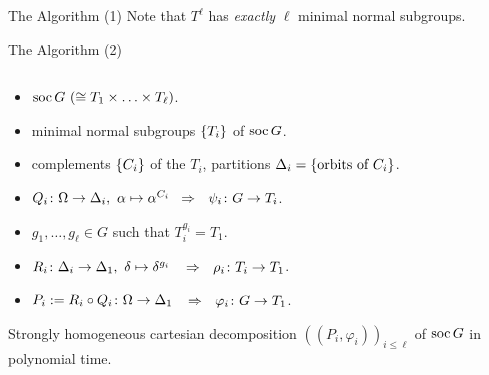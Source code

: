 \begin{frame}{The Algorithm (1)}
    \centering
    \large
    Note that $T ^ \ell$ has \emph{exactly} $\ell$ minimal normal subgroups.
\end{frame}

\begin{frame}{The Algorithm (2)}
    \begin{alg}
        $~$
        \\[-1em]
        \begin{itemize}
            \item
            $\operatorname{soc} G ~ (\cong T_1 \times \ldots \times T_\ell)$.
            \pause
            \item
            minimal normal subgroups $ \left\{  T_i  \right\} $ of $\operatorname{soc} G$.
            \pause
            \item
            complements $ \left\{  C_i  \right\} $ of the $T_i$,
            partitions $\Delta_i =  \left\{  \text{orbits of } C_i  \right\} $.
            \pause
            \item
            $Q_i \colon \Omega \rightarrow \Delta_i,
            ~ \alpha \mapsto \alpha ^ {C_i}$
            \pause
            $~\Rightarrow~~ \psi_i \colon G \rightarrow T_i$.
            \pause
            \item
            $g_1, \ldots, g_\ell \in G$ such that $T_i ^ {g_i} = T_1$.
            \pause
            \item
            $R_i \colon \Delta_i \rightarrow \Delta_1,
            ~ \delta \mapsto \delta ^ {g_i}$
            \pause
            $~~\Rightarrow~~ \rho_i \colon T_i \rightarrow T_1$.
            \pause
            \item
            $P_i := R_i \circ Q_i \colon \Omega \rightarrow \Delta_1$
            \pause
            $~~\Rightarrow~~ \varphi_i \colon G \rightarrow T_1$.
        \end{itemize}
    \end{alg}
    \pause

    Strongly homogeneous cartesian decomposition
    $((P_i, \varphi_i))_{i \leq \ell}$
    of
    $\operatorname{soc} G$ in polynomial time.
\end{frame}
